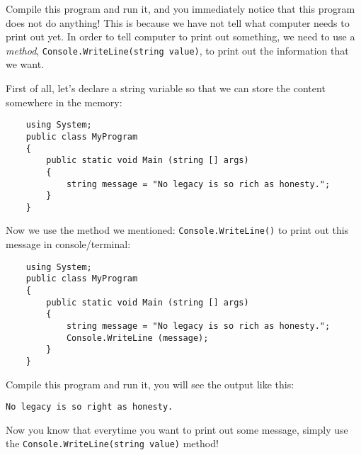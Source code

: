 \documentclass[../main.tex]{subfiles}
\begin{document}
    Compile this program and run it, and you immediately notice that this
    program does not do anything! This is because we have not tell what computer
    needs to print out yet. In order to tell computer to print out something, we
    need to use a \emph{method}, \texttt{Console.WriteLine(string value)},
    to print out the information that we want.

    First of all, let's declare a string variable so that we can store the content
    somewhere in the memory:

    \begin{verbatim}
    using System;
    public class MyProgram
    {
        public static void Main (string [] args)
        {
            string message = "No legacy is so rich as honesty.";
        }
    }
    \end{verbatim}

    Now we use the method we mentioned: \texttt{Console.WriteLine()} to print out
    this message in console/terminal:

    \begin{verbatim}
    using System;
    public class MyProgram
    {
        public static void Main (string [] args)
        {
            string message = "No legacy is so rich as honesty.";
            Console.WriteLine (message);
        }
    }
    \end{verbatim}

    Compile this program and run it, you will see the output like this:

    \texttt{No legacy is so right as honesty.}

    Now you know that everytime you want to print out some message, simply use
    the \texttt{Console.WriteLine(string value)} method!
\end{document}
